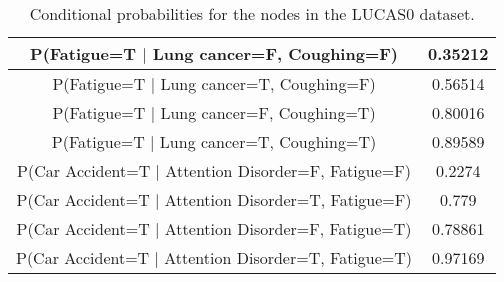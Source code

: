 \documentclass{article}
\begin{document}
\begin{table}[h]
\begin{tabular}{|c|c|}
        P(Fatigue=T $\vert$ Lung cancer=F, Coughing=F) & 0.35212 \\ \hline
        P(Fatigue=T $\vert$ Lung cancer=T, Coughing=F) & 0.56514 \\ \hline
        P(Fatigue=T $\vert$ Lung cancer=F, Coughing=T) & 0.80016 \\ \hline
        P(Fatigue=T $\vert$ Lung cancer=T, Coughing=T) & 0.89589 \\ \hline
        P(Car Accident=T $\vert$ Attention Disorder=F, Fatigue=F) & 0.2274 \\ \hline
        P(Car Accident=T $\vert$ Attention Disorder=T, Fatigue=F) & 0.779 \\ \hline
        P(Car Accident=T $\vert$ Attention Disorder=F, Fatigue=T) & 0.78861 \\ \hline
        P(Car Accident=T $\vert$ Attention Disorder=T, Fatigue=T) & 0.97169 \\ \hline
        \hline
    \end{tabular}
    \caption{Conditional probabilities for the nodes in the LUCAS0 dataset.}
    \label{tab:lucas_probs}
\end{table}
\end{document}
